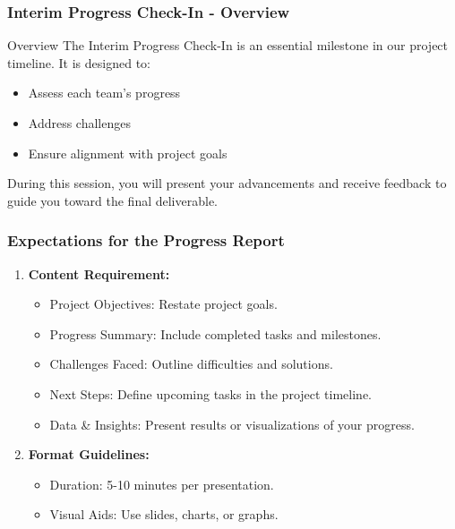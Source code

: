 \documentclass[aspectratio=169]{beamer}
\begin{document}
\begin{frame}[fragile]
    \frametitle{Interim Progress Check-In - Overview}
    \begin{block}{Overview}
    The Interim Progress Check-In is an essential milestone in our project timeline. 
    It is designed to:
    \begin{itemize}
        \item Assess each team's progress
        \item Address challenges
        \item Ensure alignment with project goals
    \end{itemize}
    During this session, you will present your advancements and receive feedback to guide you toward the final deliverable.
    \end{block}
\end{frame}

\begin{frame}[fragile]
    \frametitle{Expectations for the Progress Report}
    \begin{enumerate}
        \item \textbf{Content Requirement:}
        \begin{itemize}
            \item Project Objectives: Restate project goals.
            \item Progress Summary: Include completed tasks and milestones.
            \item Challenges Faced: Outline difficulties and solutions.
            \item Next Steps: Define upcoming tasks in the project timeline.
            \item Data \& Insights: Present results or visualizations of your progress.
        \end{itemize}
        
        \item \textbf{Format Guidelines:}
        \begin{itemize}
            \item Duration: 5-10 minutes per presentation.
            \item Visual Aids: Use slides, charts, or graphs.
        \end{itemize}
    \end{enumerate}
\end{frame}
\end{document}
